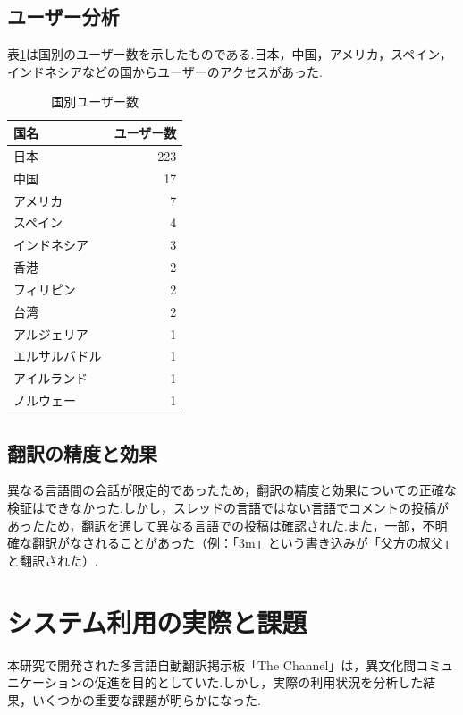 \documentclass[b5paper,12pt,dvipdfmx]{jsreport}
\begin{document}
\subsection{ユーザー分析}
表\ref{table:user-by-country}は国別のユーザー数を示したものである.日本，中国，アメリカ，スペイン，インドネシアなどの国からユーザーのアクセスがあった.

\begin{table}[H]
    \centering
    \caption{国別ユーザー数}
    \label{table:user-by-country}
    \begin{tabular}{|l|r|}
        \hline
        \textbf{国名} & \textbf{ユーザー数} \\
        \hline
        日本     & 223 \\
        中国     & 17 \\
        アメリカ & 7 \\
        スペイン & 4 \\
        インドネシア & 3 \\
        香港 & 2  \\
        フィリピン   & 2  \\
        台湾 & 2 \\
        アルジェリア   & 1 \\
        エルサルバドル   & 1 \\
        アイルランド   & 1  \\
        ノルウェー & 1  \\
        \hline
    \end{tabular}
\end{table}

\subsection{翻訳の精度と効果}
異なる言語間の会話が限定的であったため，翻訳の精度と効果についての正確な検証はできなかった.しかし，スレッドの言語ではない言語でコメントの投稿があったため，翻訳を通して異なる言語での投稿は確認された.また，一部，不明確な翻訳がなされることがあった（例：「3m」という書き込みが「父方の叔父」と翻訳された）.


\section{システム利用の実際と課題}

本研究で開発された多言語自動翻訳掲示板「The Channel」は，異文化間コミュニケーションの促進を目的としていた.しかし，実際の利用状況を分析した結果，いくつかの重要な課題が明らかになった.
\end{document}
